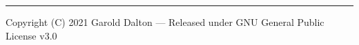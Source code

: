 \documentclass[12pt]{article}
\begin{document}
\begin{align*}
\end{align*}

\begin{align*}
\end{align*}

\begin{lstlisting}[language=Python]
\end{lstlisting}

\noindent\rule{\textwidth}{1pt}
{\footnotesize Copyright (C) 2021 Garold Dalton --- Released under GNU General Public License v3.0}

\cleardoublepage
\end{document}
